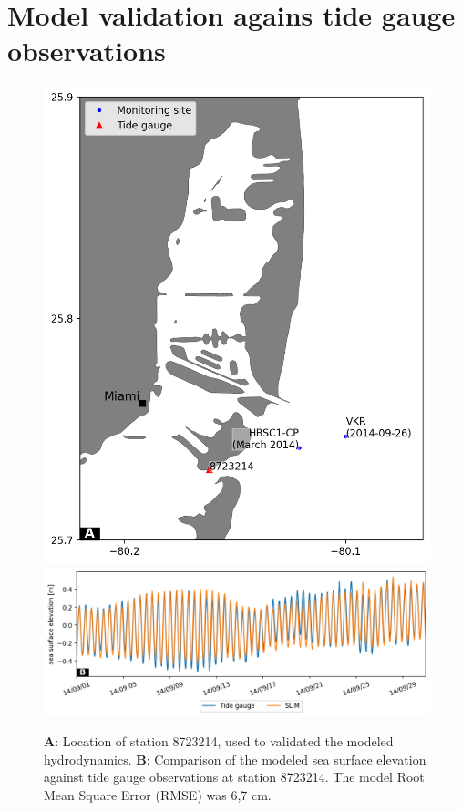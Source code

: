 \documentclass[preprint,12pt,authoryear]{elsarticle}
\begin{document}
\section{Model validation agains tide gauge observations}\label{onset:validation}
\begin{figure}[h!]
    \centering
	\includegraphics[width=.5\textwidth]{figures/fig_tide_gauge.png}
	\includegraphics[width=\textwidth]{figures/validation_VK_september.png}
	\caption{\textbf{A}: Location of station 8723214, used to validated the modeled hydrodynamics. \textbf{B}: Comparison of the modeled sea surface elevation against tide gauge observations at station 8723214. The model Root Mean Square Error (RMSE) was 6,7 cm.}
\end{figure}
\end{document}
